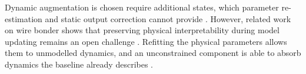 Dynamic augmentation is chosen
require additional states, which
parameter re-estimation
and static output correction cannot provide \cite{hoekstra2026lfr}.
However, related work on  wire bonder shows that preserving
physical interpretability during model updating remains an open challenge
\cite{kessels2025ai}.
Refitting the physical parameters allows them to  unmodelled dynamics,
and an unconstrained  component is able to absorb dynamics
the baseline already describes \cite{gyorok2026obc}.
\\
